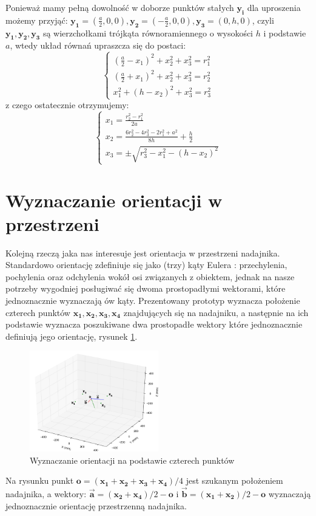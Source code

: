 Ponieważ mamy pełną dowolność w doborze punktów stałych $\boldsymbol{y_i}$ dla uproszenia możemy przyjąć:
$\boldsymbol{y_1}=(\frac{a}{2},0,0), \boldsymbol{y_2}=(-\frac{a}{2},0,0), \boldsymbol{y_3}=(0,h,0)$, czyli $\boldsymbol{y_1}, \boldsymbol{y_2}, \boldsymbol{y_3}$ są wierzchołkami
trójkąta równoramiennego o wysokości $h$ i podstawie $a$, wtedy układ równań upraszcza
się do postaci:
\[
 \begin{cases}
     (\frac{a}{2}-x_1)^2 + x_2^2 + x_3^2 = r_1^2
 \\  (\frac{a}{2}+x_1)^2 + x_2^2 + x_3^2 = r_2^2
 \\  x_1^2 + (h-x_2)^2 + x_3^2 = r_3^2
 \end{cases}
\]
z czego ostatecznie otrzymujemy:
\[
 \begin{cases}
     x_1 = \frac{r_2^2 - r_1^2}{2a}
 \\  x_2 = \frac{6r_2^2 - 4r_3^2 - 2r_1^2 + a^2}{8h}  + \frac{h}{2}
 \\  x_3 = \pm \sqrt{r_3^2-x_1^2-(h-x_2)^2}
 \end{cases}
\]


\section{Wyznaczanie orientacji w przestrzeni}


Kolejną rzeczą jaka nas interesuje jest orientacja w przestrzeni nadajnika.
Standardowo orientację zdefiniuje się jako (trzy) kąty Eulera \cite{bib:katyEulera}: przechylenia, 
pochylenia oraz odchylenia wokół osi związanych z obiektem, jednak na nasze potrzeby wygodniej 
posługiwać się dwoma prostopadłymi wektorami, które jednoznacznie wyznaczają ów kąty. 
Prezentowany prototyp wyznacza położenie czterech punktów $\boldsymbol{x_1, x_2, x_3, x_4}$ znajdujących się
na nadajniku, a następnie na ich podstawie wyznacza poszukiwane dwa prostopadłe wektory które jednoznacznie
definiują jego orientację, rysunek \ref{fig:orientacja}.
 \begin{figure}[H]
    \centering
    \includegraphics[width=0.5\textwidth, trim= 0mm 0mm 0mm 0mm,clip]{orientacja}
    \caption{Wyznaczanie orientacji na podstawie czterech punktów}
    \label{fig:orientacja}
\end{figure}
Na rysunku punkt $\boldsymbol{o} = (\boldsymbol{x_1} + \boldsymbol{x_2} + \boldsymbol{x_3} + \boldsymbol{x_4})/4$ jest szukanym położeniem
nadajnika, a wektory: $\boldsymbol{\overrightarrow{a}} = (\boldsymbol{x_2} + \boldsymbol{x_4})/2 - \boldsymbol{o}$ i 
$\boldsymbol{\overrightarrow{b}} = (\boldsymbol{x_1} + \boldsymbol{x_2})/2 - \boldsymbol{o}$ wyznaczają jednoznacznie
orientację przestrzenną nadajnika.

